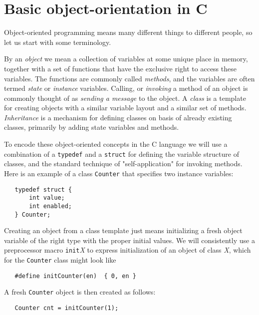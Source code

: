 \documentclass[12pt]{article}
\begin{document}
\section{Basic object-orientation in C}
\label{sect:basic-oo}

Object-oriented programming means many different things to different people, so let us start with some terminology.

By an {\em object} we mean a collection of variables at some unique place in memory, together with a set of functions that have the exclusive right to access these variables.  The functions are commonly called {\em methods}, and the variables are often termed {\em state} or {\em instance} variables.  Calling, or {\em invoking} a method of an object is commonly thought of as {\em sending a message} to the object.  A {\em class} is a template for creating objects with a similar variable layout and a similar set of methods.  {\em Inheritance} is a mechanism for defining classes on basis of already existing classes, primarily by adding state variables and methods.

To encode these object-oriented concepts in the C language we will use a combination of a {\tt typedef} and a {\tt struct} for defining the variable structure of classes, and the standard technique of "self-application" for invoking methods.  Here is an example of a class {\tt Counter} that specifies two instance variables:
\begin{verbatim}
   typedef struct {
       int value;
       int enabled;
   } Counter;
\end{verbatim}
Creating an object from a class template just means initializing a fresh object variable of the right type with the proper initial values.  We will consistently use a preprocessor macro {\tt init}{\em X} to express initialization of an object of class {\em X}, which for the {\tt Counter} class might look like
\begin{verbatim}
   #define initCounter(en)  { 0, en }
\end{verbatim}
A fresh {\tt Counter} object is then created as follows:
\begin{verbatim}
   Counter cnt = initCounter(1);
\end{verbatim}
\end{document}
